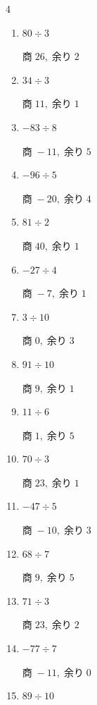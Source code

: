 \begin{multicols}{4}
\begin{enumerate}
        $商\; 3,\; 余り\; 2$

  \item $80 \div 3$

        $商\; 26,\; 余り\; 2$

  \item $34 \div 3$

        $商\; 11,\; 余り\; 1$

  \item $-83 \div 8$

        $商\; -11,\; 余り\; 5$

  \item $-96 \div 5$

        $商\; -20,\; 余り\; 4$

  \item $81 \div 2$

        $商\; 40,\; 余り\; 1$

  \item $-27 \div 4$

        $商\; -7,\; 余り\; 1$

  \item $3 \div 10$

        $商\; 0,\; 余り\; 3$

  \item $91 \div 10$

        $商\; 9,\; 余り\; 1$

  \item $11 \div 6$

        $商\; 1,\; 余り\; 5$

  \item $70 \div 3$

        $商\; 23,\; 余り\; 1$

\columnbreak %

\resetques

  \item $-47 \div 5$

        $商\; -10,\; 余り\; 3$

  \item $68 \div 7$

        $商\; 9,\; 余り\; 5$

  \item $71 \div 3$

        $商\; 23,\; 余り\; 2$

  \item $-77 \div 7$

        $商\; -11,\; 余り\; 0$

  \item $89 \div 10$


\end{enumerate}
\end{multicols}
